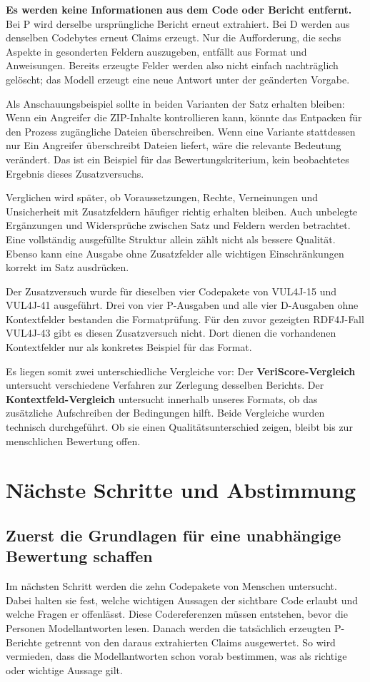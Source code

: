 \documentclass[10pt,a4paper]{article}
\begin{document}
\textbf{Es werden keine Informationen aus dem Code oder Bericht entfernt.} Bei P wird derselbe ursprüngliche Bericht erneut extrahiert. Bei D werden aus denselben Codebytes erneut Claims erzeugt. Nur die Aufforderung, die sechs Aspekte in gesonderten Feldern auszugeben, entfällt aus Format und Anweisungen. Bereits erzeugte Felder werden also nicht einfach nachträglich gelöscht; das Modell erzeugt eine neue Antwort unter der geänderten Vorgabe.

Als Anschauungsbeispiel sollte in beiden Varianten der Satz erhalten bleiben: \glqq{}Wenn ein Angreifer die ZIP-Inhalte kontrollieren kann, könnte das Entpacken für den Prozess zugängliche Dateien überschreiben.\grqq{} Wenn eine Variante stattdessen nur \glqq{}Ein Angreifer überschreibt Dateien\grqq{} liefert, wäre die relevante Bedeutung verändert. Das ist ein Beispiel für das Bewertungskriterium, kein beobachtetes Ergebnis dieses Zusatzversuchs.

Verglichen wird später, ob Voraussetzungen, Rechte, Verneinungen und Unsicherheit mit Zusatzfeldern häufiger richtig erhalten bleiben. Auch unbelegte Ergänzungen und Widersprüche zwischen Satz und Feldern werden betrachtet. Eine vollständig ausgefüllte Struktur allein zählt nicht als bessere Qualität. Ebenso kann eine Ausgabe ohne Zusatzfelder alle wichtigen Einschränkungen korrekt im Satz ausdrücken.

Der Zusatzversuch wurde für dieselben vier Codepakete von VUL4J-15 und VUL4J-41 ausgeführt. Drei von vier P-Ausgaben und alle vier D-Ausgaben ohne Kontextfelder bestanden die Formatprüfung. Für den zuvor gezeigten RDF4J-Fall VUL4J-43 gibt es diesen Zusatzversuch nicht. Dort dienen die vorhandenen Kontextfelder nur als konkretes Beispiel für das Format.

Es liegen somit zwei unterschiedliche Vergleiche vor: Der \textbf{VeriScore-Vergleich} untersucht verschiedene Verfahren zur Zerlegung desselben Berichts. Der \textbf{Kontextfeld-Vergleich} untersucht innerhalb unseres Formats, ob das zusätzliche Aufschreiben der Bedingungen hilft. Beide Vergleiche wurden technisch durchgeführt. Ob sie einen Qualitätsunterschied zeigen, bleibt bis zur menschlichen Bewertung offen.

\newpage
\section{Nächste Schritte und Abstimmung}
\subsection{Zuerst die Grundlagen für eine unabhängige Bewertung schaffen}
Im nächsten Schritt werden die zehn Codepakete von Menschen untersucht. Dabei halten sie fest, welche wichtigen Aussagen der sichtbare Code erlaubt und welche Fragen er offenlässt. Diese Codereferenzen müssen entstehen, bevor die Personen Modellantworten lesen. Danach werden die tatsächlich erzeugten P-Berichte getrennt von den daraus extrahierten Claims ausgewertet. So wird vermieden, dass die Modellantworten schon vorab bestimmen, was als richtige oder wichtige Aussage gilt.
\end{document}
